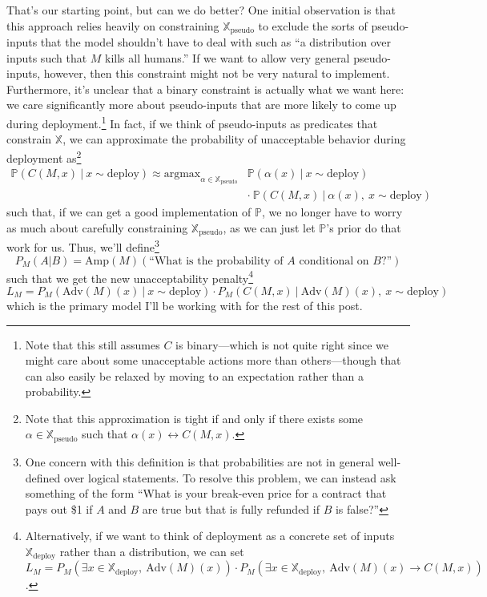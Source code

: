 \documentclass{amsart}
\begin{document}
That's our starting point, but can we do better? One initial observation is that this approach relies heavily on constraining $\mathbb X_\text{pseudo}$ to exclude the sorts of pseudo-inputs that the model shouldn't have to deal with such as ``a distribution over inputs such that $M$ kills all humans.'' If we want to allow very general pseudo-inputs, however, then this constraint might not be very natural to implement. Furthermore, it's unclear that a binary constraint is actually what we want here: we care significantly more about pseudo-inputs that are more likely to come up during deployment.\footnote{Note that this still assumes $C$ is binary---which is not quite right since we might care about some unacceptable actions more than others---though that can also easily be relaxed by moving to an expectation rather than a probability.} In fact, if we think of pseudo-inputs as predicates that constrain $\mathbb X$, we can approximate the probability of unacceptable behavior during deployment as\footnote{Note that this approximation is tight if and only if there exists some $\alpha \in \mathbb X_\text{pseudo}$ such that $\alpha(x) \leftrightarrow C(M, x)$.}
\begin{align*}
    \mathbb P(C(M, x) \ |\ x \sim \text{deploy}) \approx \text{argmax}_{\alpha \in \mathbb X_\text{pseudo}} & \mathbb P(\alpha(x) \ |\ x \sim \text{deploy}) \\
    & \cdot\ \mathbb P(C(M, x) \ |\ \alpha(x),~ x \sim \text{deploy})
\end{align*}
such that, if we can get a good implementation of $\mathbb P$, we no longer have to worry as much about carefully constraining $\mathbb X_\text{pseudo}$, as we can just let $\mathbb P$'s prior do that work for us. Thus, we'll define\footnote{One concern with this definition is that probabilities are not in general well-defined over logical statements. To resolve this problem, we can instead ask something of the form ``What is your break-even price for a contract that pays out \$1 if $A$ and $B$ are true but that is fully refunded if $B$ is false?''}
\[
    P_M(A|B) = \text{Amp}(M)(\text{``What is the probability of } A \text{ conditional on } B \text{?''})
\]
such that we get the new unacceptability penalty\footnote{Alternatively, if we want to think of deployment as a concrete set of inputs $\mathbb X_\text{deploy}$ rather than a distribution, we can set $L_M = P_M(\exists x \in \mathbb X_\text{deploy},~ \text{Adv}(M)(x)) \cdot P_M(\exists x \in \mathbb X_\text{deploy},~ \text{Adv}(M)(x) \to C(M, x))$.}
\[
    L_M = P_M(\text{Adv}(M)(x) \ |\ x \sim \text{deploy}) \cdot P_M(C(M, x) \ |\ \text{Adv}(M)(x),~ x \sim \text{deploy})
\]
which is the primary model I'll be working with for the rest of this post.
\end{document}
